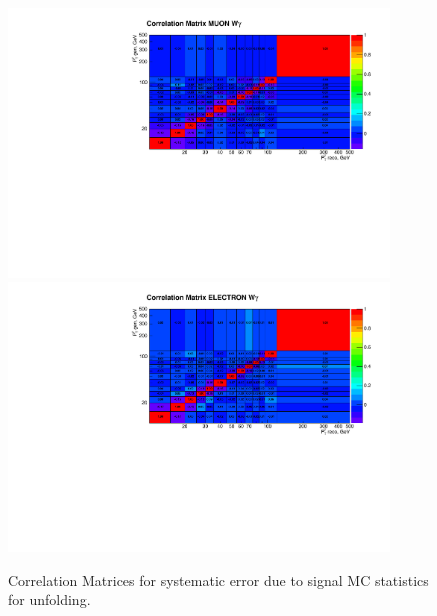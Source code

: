 \begin{figure}[htb]
  \begin{center}
   \includegraphics[width=0.90\textwidth]{../figs/figs_v11/MUON_WGamma/Constants/matrCorrelation_unf_MC_stat.pdf}\\
\includegraphics[width=0.90\textwidth]{../figs/figs_v11/ELECTRON_WGamma/Constants/matrCorrelation_unf_MC_stat.pdf}
  \caption{Correlation Matrices for systematic error due to signal MC statistics for unfolding.}
  \label{fig:corrMatrices_syst_unf_MC_stat_Wg}
  \end{center}
\end{figure}

